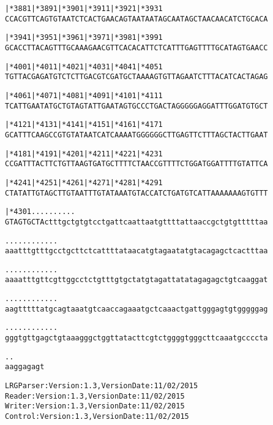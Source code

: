 \documentclass{article}
\begin{document}
\begin{alltt}
   |*3881    |*3891    |*3901    |*3911    |*3921    |*3931 
CCACGTTCAGTGTAATCTCACTGAACAGTAATAATAGCAATAGCTAACAACATCTGCACA

   |*3941    |*3951    |*3961    |*3971    |*3981    |*3991 
GCACCTTACAGTTTGCAAAGAACGTTCACACATTCTCATTTGAGTTTTGCATAGTGAACC

   |*4001    |*4011    |*4021    |*4031    |*4041    |*4051 
TGTTACGAGATGTCTCTTGACGTCGATGCTAAAAGTGTTAGAATCTTTACATCACTAGAG

   |*4061    |*4071    |*4081    |*4091    |*4101    |*4111 
TCATTGAATATGCTGTAGTATTGAATAGTGCCCTGACTAGGGGGAGGATTTGGATGTGCT

   |*4121    |*4131    |*4141    |*4151    |*4161    |*4171 
GCATTTCAAGCCGTGTATAATCATCAAAATGGGGGGCTTGAGTTCTTTAGCTACTTGAAT

   |*4181    |*4191    |*4201    |*4211    |*4221    |*4231 
CCGATTTACTTCTGTTAAGTGATGCTTTTCTAACCGTTTTCTGGATGGATTTTGTATTCA

   |*4241    |*4251    |*4261    |*4271    |*4281    |*4291 
CTATATTGTAGCTTGTAATTTGTATAAATGTACCATCTGATGTCATTAAAAAAAGTGTTT

   |*4301    .    .    .    .    .    .    .    .    .    . 
GTAGTGCTActttgctgtgtcctgattcaattaatgttttattaaccgctgtgtttttaa

   .    .    .    .    .    .    .    .    .    .    .    . 
aaatttgtttgcctgcttctcattttataacatgtagaatatgtacagagctcactttaa

   .    .    .    .    .    .    .    .    .    .    .    . 
aaaatttgttcgttggcctctgtttgtgctatgtagattatatagagagctgtcaaggat

   .    .    .    .    .    .    .    .    .    .    .    . 
aagtttttatgcagtaaatgtcaaccagaaatgctcaaactgattgggagtgtgggggag

   .    .    .    .    .    .    .    .    .    .    .    . 
gggtgttgagctgtaaagggctggttatacttcgtctggggtgggcttcaaatgccccta

   .    .
aaggagagt
\end{alltt}
\newpage
\begin{alltt}
LRG Parser: Version: 1.3, Version Date: 11/02/2015
Reader: Version: 1.3, Version Date: 11/02/2015
Writer: Version: 1.3, Version Date: 11/02/2015
Control: Version: 1.3, Version Date: 11/02/2015
\end{alltt}
\end{document}
